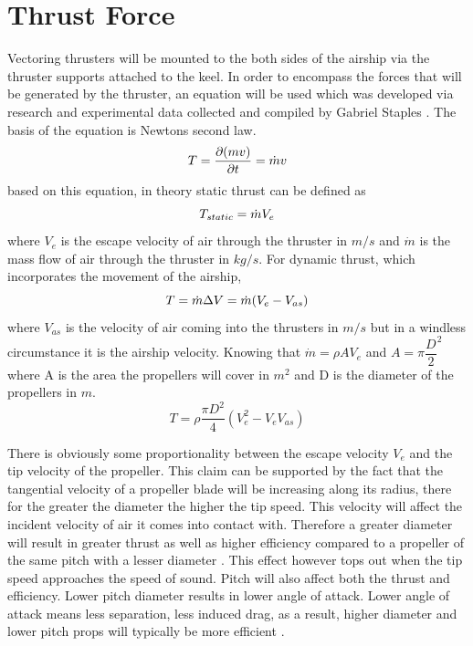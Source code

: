 \documentclass[../main.tex]{subfiles}
\begin{document}
\section{Thrust Force} \label{appendix:thrust}

Vectoring thrusters will be mounted to the both sides of the airship via the thruster supports attached to the keel. In order to encompass the forces that will be generated by the thruster, an equation will be used which was developed via research and experimental data collected and compiled by Gabriel Staples \cite{thrusteq}. The basis of the equation is Newtons second law.
	\begin{displaymath}
	T = {\dfrac{\partial (mv)}{\partial t}} = \dot{m}v\\
	\end{displaymath}
		based on this equation, in theory static thrust can be defined as
	\begin{displaymath}
		T_{static}  = \dot{m}V_{e}\\
	\end{displaymath}
	where $V_{e}$ is the escape velocity of air through the thruster in $m/s$ and $\dot{m}$ is the mass flow of air through the thruster in $kg/s$. For dynamic thrust, which incorporates the movement of the airship,
	\begin{displaymath}
	T  = \dot{m}\Delta V = \dot{m}(V_{e}-V_{as})\\
	\end{displaymath}
	where $V_{as}$ is the velocity of air coming into the thrusters in $m/s$ but in a windless circumstance it is the airship velocity. Knowing that $\dot{m} = \rho A V_{e}$ and $A = \pi {\dfrac{D}{2}}^2$ where A is the area the propellers will cover in $m^2$ and D is the diameter of the propellers in $m$.
	\begin{equation}
    \label{eqn:thrusttheoretical}
	T = \rho \dfrac{\pi D^2}{4} (V_{e}^2 - V_{e} V_{as})
	\end{equation}
    
There is obviously some proportionality between the escape velocity $V_{e}$ and the tip velocity of the propeller. This claim can be supported by the fact that the tangential velocity of a propeller blade will be increasing along its radius, there for the greater the diameter the higher the tip speed. This velocity will affect the incident velocity of air it comes into contact with. Therefore a greater diameter will result in greater thrust as well as higher efficiency compared to a propeller of the same pitch with a lesser diameter \cite{thrusteq}. This effect however tops out when the tip speed approaches the speed of sound. Pitch will also affect both the thrust and efficiency. Lower pitch diameter results in  lower angle of attack. Lower angle of attack means less separation, less induced drag, as a result, higher diameter and lower pitch props will typically be more efficient \cite{thrusteq}.\\
	
\end{document}
